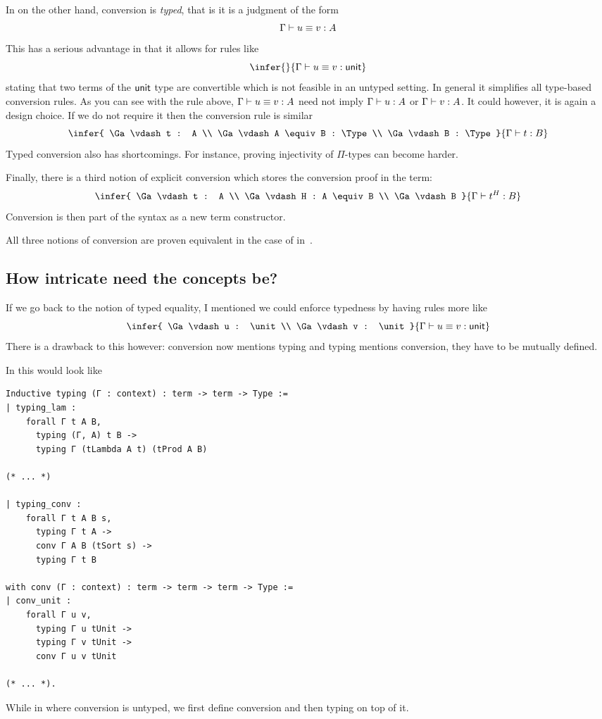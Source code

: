 In \Agda on the other hand, conversion is \emph{typed}, that is it is a judgment
of the form
\[
  \Gamma \vdash u \equiv v : A
\]
This has a serious advantage in that it allows for rules like
\[
  \infer
    { }
    {\Ga \vdash u \equiv v : \unit}
\]
stating that two terms of the \(\mathsf{unit}\) type are convertible which is not
feasible in an untyped setting. In general it simplifies all type-based
conversion rules. As you can see with the rule above,
\(\Gamma \vdash u \equiv v : A\) need not imply \(\Gamma \vdash u : A\) or
\(\Gamma \vdash v : A\). It could however, it is again a design choice.
If we do not require it then the conversion rule is similar
\[
  \infer
    {
      \Ga \vdash t : A \\
      \Ga \vdash A \equiv B : \Type \\
      \Ga \vdash B : \Type
    }
    {\Ga \vdash t : B}
\]
Typed conversion also has shortcomings. For instance, proving injectivity of
\(\Pi\)-types can become harder.

Finally, there is a third notion of explicit conversion which stores the
conversion proof in the term:
\[
  \infer
    {
      \Ga \vdash t : A \\
      \Ga \vdash H : A \equiv B \\
      \Ga \vdash B
    }
    {\Ga \vdash t^H : B}
\]
Conversion is then part of the syntax as a new term constructor.

All three notions of conversion are proven equivalent in the case of
 in~.

\subsection{How intricate need the concepts be?}

If we go back to the notion of typed equality, I mentioned we could enforce
typedness by having rules more like
\[
  \infer
    {
      \Ga \vdash u : \unit \\
      \Ga \vdash v : \unit
    }
    {\Ga \vdash u \equiv v : \unit}
\]
There is a drawback to this however: conversion now mentions typing and typing
mentions conversion, they have to be mutually defined.

In \Coq this would look like
\begin{verbatim}
Inductive typing (Γ : context) : term -> term -> Type :=
| typing_lam :
    forall Γ t A B,
      typing (Γ, A) t B ->
      typing Γ (tLambda A t) (tProd A B)

(* ... *)

| typing_conv :
    forall Γ t A B s,
      typing Γ t A ->
      conv Γ A B (tSort s) ->
      typing Γ t B

with conv (Γ : context) : term -> term -> term -> Type :=
| conv_unit :
    forall Γ u v,
      typing Γ u tUnit ->
      typing Γ v tUnit ->
      conv Γ u v tUnit

(* ... *).
\end{verbatim}
While in \MetaCoq where conversion is untyped, we first define conversion
and then typing on top of it.


